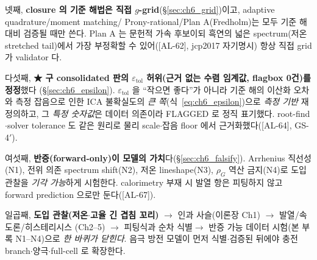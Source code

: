 \documentclass[11pt,a4paper]{article}
\newcommand{\tol}{\mathrm{tol}}
\newcommand{\AL}[1]{\textsf{[AL-#1]}}
\begin{document}
넷째, \textbf{closure 의 기준 해법은 직접 $g$-grid}(\S\ref{sec:ch6_grid})이고, adaptive quadrature/moment matching/
Prony-rational/Plan A(Fredholm)는 모두 기준 해 대비 검증될 때만 쓴다. Plan A 는 문헌적 가속 후보이되 흑연의 넓은
spectrum(저온 stretched tail)에서 가장 부정확할 수 있어(\AL{62}, jcp2017 자기명시) 항상 직접 grid 가 validator 다.

다섯째, \textbf{★ 구 consolidated 판의 $\varepsilon_\tol$ 허위(근거 없는 수렴 임계값, flagbox 0건)를 정정}했다
(\S\ref{sec:ch6_epsilon}). $\varepsilon_\tol$ 을 ``작으면 좋다''가 아니라 기준 해의 이산화 오차와 측정 잡음으로
인한 ICA 불확실도의 \emph{큰 쪽}(식~\eqref{eq:ch6_epsilon})으로 \emph{측정 기반} 재정의하고, 그 \emph{특정 숫자값}은
데이터 의존이라 FLAGGED 로 정직 표기했다. root-find$\cdot$solver tolerance 도 같은 원리로 물리 scale$\cdot$잡음
floor 에서 근거화했다(\AL{64}, GS-4$'$).

여섯째, \textbf{반증(forward-only)이 모델의 가치}다(\S\ref{sec:ch6_falsify}). Arrhenius 직선성(N1), 전위 의존
spectrum shift(N2), 저온 lineshape(N3), $\rho_G$ 역산 금지(N4)로 도입 관찰을 \emph{기각 가능}하게 시험한다.
calorimetry 부재 시 발열 항은 피팅하지 않고 forward prediction 으로만 둔다(\AL{67}).

일곱째, \textbf{도입 관찰(저온$\cdot$고율 긴 겹침 꼬리)} $\to$ 인과 사슬(이론장 Ch1) $\to$ 발열/속도론/히스테리시스
(Ch2--5) $\to$ 피팅식과 순차 식별$\to$ 반증 가능 데이터 시험(본 부록 N1--N4)으로 \emph{한 바퀴가 닫힌다}. 음극
방전 모델이 먼저 식별$\cdot$검증된 뒤에야 충전 branch$\cdot$양극$\cdot$full-cell 로 확장한다.
\end{document}
